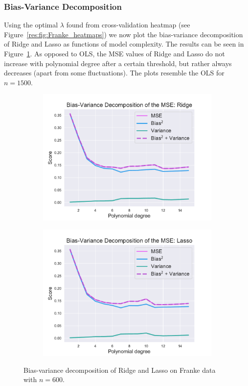 \documentclass[twocolumn,english,notitlepage]{article}
\begin{document}
        \subsubsection{Bias-Variance Decomposition}
            Using the optimal $\lambda$ found from cross-validation heatmap (see Figure~\ref{res:fig:Franke_heatmaps}) we now plot the bias-variance decomposition of Ridge and Lasso as functions of model complexity. The results can be seen in Figure~\ref{res:fig:bs_bias_var_Ridge_Lasso}. As opposed to OLS, the MSE values of Ridge and Lasso do not increase with polynomial degree after a certain threshold, but rather always decreases (apart from some fluctuations). The plots resemble the OLS for $n=1500$. 

            \begin{figure}[ht]
                \begin{subfigure}{\linewidth}
                    \centering
                    \includegraphics[width=.9\linewidth]{BS_Bias_var_decomp_Ridge.pdf}
                \end{subfigure}
                \begin{subfigure}{\linewidth}
                    \centering
                    \includegraphics[width=.9\linewidth]{BS_Bias_var_decomp_Lasso.pdf}
                \end{subfigure}
                \caption{Bias-variance decomposition of Ridge and Lasso on Franke data with $n=600$.}
                \label{res:fig:bs_bias_var_Ridge_Lasso}
            \end{figure}
\end{document}

